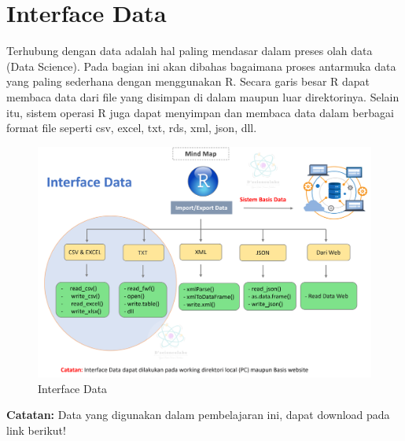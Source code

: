 \documentclass[
]{book}
\begin{document}
\hypertarget{interface-data}{%
\chapter{Interface Data}\label{interface-data}}

Terhubung dengan data adalah hal paling mendasar dalam preses olah data (Data Science). Pada bagian ini akan dibahas bagaimana proses antarmuka data yang paling sederhana dengan menggunakan R. Secara garis besar R dapat membaca data dari file yang disimpan di dalam maupun luar direktorinya. Selain itu, sistem operasi R juga dapat menyimpan dan membaca data dalam berbagai format file seperti csv, excel, txt, rds, xml, json, dll.

\begin{figure}

{\centering \includegraphics[width=1\linewidth]{./images/Bab7/Interface_Data} 

}

\caption{Interface Data}\label{fig:interface}
\end{figure}

\textbf{Catatan:} Data yang digunakan dalam pembelajaran ini, dapat download pada link berikut!
\end{document}
